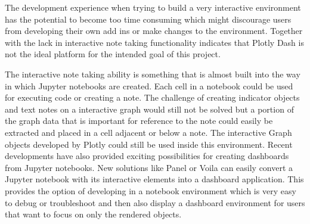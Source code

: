 The development experience when trying to build a very interactive environment has the potential to become too time consuming which might discourage users from developing their own add ins or make changes to the environment. Together with the lack in interactive note taking functionality indicates that Plotly Dash is not the ideal platform for the intended goal of this project.

The interactive note taking ability is something that is almost built into the way in which Jupyter notebooks are created. Each cell in a notebook could be used for executing code or creating a note. The challenge of creating indicator objects and text notes on a interactive graph would still not be solved but a portion of the graph data that is important for reference to the note could easily be extracted and placed in a cell adjacent or below a note. The interactive Graph objects developed by Plotly could still be used inside this environment. Recent developments have also provided exciting possibilities for creating dashboards from Jupyter notebooks. New solutions like Panel or Voila can easily convert a Jupyter notebook with its interactive elements into a dashboard application. This provides the option of developing in a notebook environment which is very easy to debug or troubleshoot and then also display a dashboard environment for users that want to focus on only the rendered objects.





